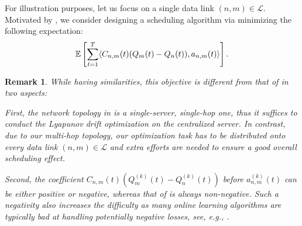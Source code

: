 \documentclass[11pt,fullpage,letterpaper]{article} %
\newtheorem{remark}{Remark}
\renewcommand{\bm}[1]{#1}%
\newcommand{\E}{\operatornamewithlimits{\mathbb{E}}}
\newcommand{\mL}{{\mathcal L}}
\begin{document}
For illustration purposes, let us focus on a single data link $(n,m)\in \mL$. Motivated by \citet{huang2023queue}, we consider designing a scheduling algorithm via minimizing the following expectation:
\begin{equation*}
\E\left [\sum_{t=1}^T \langle C_{n,m}(t) (\bm Q_m(t)-\bm Q_n(t)),\bm a_{n,m}(t)\rangle\right ].
\end{equation*}

\begin{remark}
While having similarities, this objective is different from that of \citet{huang2023queue} in two aspects:

First, the network topology in \citep{huang2023queue} is a single-server, single-hop one, thus it suffices to conduct the Lyapunov drift optimization on the centralized server. In contrast, due to our multi-hop topology, our optimization task  has to be distributed onto every data link $(n,m)\in \mL$ and extra efforts are needed to ensure a good overall scheduling effect.

Second, the coefficient $C_{n,m}(t) (Q_m^{(k)}(t)-Q_n^{(k)}(t))$ before $a_{n,m}^{(k)}(t)$ can be either positive or negative, whereas that of \citet{huang2023queue} is always non-negative. Such a negativity also increases the difficulty as many online learning algorithms are typically bad at handling potentially negative losses, see, \textit{e.g.}, \citep{zheng2019equipping,dai2023refined}.
\end{remark}
\end{document}

